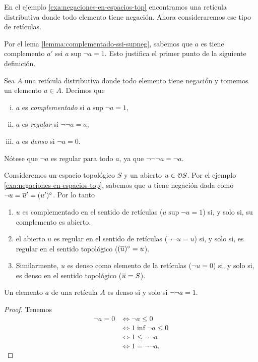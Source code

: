 En el ejemplo \ref{exa:negaciones-en-espacios-top} encontramos
una retícula distributiva donde todo elemento tiene negación.
Ahora consideraremos ese tipo de retículas.

Por el lema \ref{lemma:complementado-ssi-supneg}, sabemos que
$a$ es tiene complemento $a'$ ssi $a\sup\neg a=1$.
Esto justifica el primer punto de la siguiente definición.
\begin{definition}
  Sea $A$ una retícula distributiva donde todo elemento tiene
  negación y tomemos un elemento $a\in A$.
  Decimos que
  \begin{enumerate}[(i)]
    \item $a$ es \emph{complementado} si $a\sup\neg a=1$,
    \item $a$ es \emph{regular} si $\neg\neg a = a$,
    \item $a$ es \emph{denso} si $\neg a = 0$.
  \end{enumerate}
\end{definition}

Nótese que $\neg a$ es regular para todo $a$, ya que
$\neg\neg\neg a =\neg a$.

\begin{example}
  Consideremos un espacio topológico $S$ y un abierto $u\in\cal
  OS$. Por el ejemplo \ref{exa:negaciones-en-espacios-top},
  sabemos que $u$ tiene negación dada como $\neg u=\ol
  u'=(u')^\circ$.
  Por lo tanto
  \begin{enumerate}
    \item
    $u$ es complementado en el sentido de retículas
    ($u\sup\neg u=1$)
    si, y solo si, su complemento es abierto.
    \item
    el abierto $u$ es regular en el sentido de retículas
    ($\neg\neg u = u$)
    si, y solo si, es regular en el sentido topológico
    ($(\ol u)^\circ=u$).
    \item
    Similarmente, $u$ es denso como elemento de la retículas
    ($\neg u=0$)
    si, y solo si, es denso en el sentido topológico
    ($\ol u=S$).
  \end{enumerate}
\end{example}

\begin{proposition}
  Un elemento $a$ de una retícula $A$ es denso
   si y solo si $\neg\neg a = 1$.
\end{proposition}
\begin{proof}
Tenemos
\begin{align*}
  \neg a = 0
  &\iff \neg a \leq 0 \\
  &\iff 1\inf \neg a \leq 0 \\
  &\iff 1\leq \neg\neg a \\
  &\iff 1=\neg\neg a.
\end{align*}
\end{proof}



